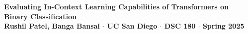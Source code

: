 \documentclass[article,36pt,extrafontsizes,oneside,openany,oldfontcommands]{memoir}
\begin{document}
\begin{topbox}
  \color{titletextcol}
  \vspace{1.2in}
  \bfseries
  \fontsize{115pt}{115pt}\selectfont
  {Evaluating In-Context Learning Capabilities of Transformers on Binary Classification}\\[0.75in]
  \color{authortextcol} 
  \mdseries
  \LARGE{Rushil Patel, Banga Bansal $\cdot$ UC San Diego $\cdot$ DSC 180 $\cdot$ Spring 2025} 
  \vspace{0.75in}
\end{topbox}


\fontsize{45pt}{55pt}\selectfont
\end{document}
